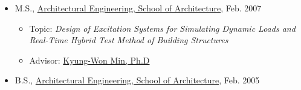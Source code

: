 \documentclass[10pt,a4paper,ragged2e]{altacv}
\begin{document}
\begin{fullwidth}
\begin{itemize}
\item M.S.,
        \href{http://cms.dankook.ac.kr/web/archi}
             {Architectural Engineering, School of Architecture},
             Feb. 2007
        \begin{itemize}
        \item Topic: \emph{Design of Excitation Systems for Simulating Dynamic Loads and Real-Time Hybrid Test Method of Building Structures}
        \item Advisor:
              \href{http://cms.dankook.ac.kr/web/archi/-16?p_p_id=DeptInfo_WAR_empInfoportlet&p_p_lifecycle=0&p_p_state=normal&p_p_mode=view&p_p_col_id=column-2&p_p_col_count=1&_DeptInfo_WAR_empInfoportlet_empId=2zEyEnhbhLlys2HRljBFWg%3D%3D&_DeptInfo_WAR_empInfoportlet_action=view_message}
                   {Kyung-Won Min, Ph.D}
        \end{itemize}
\item B.S.,
        \href{http://cms.dankook.ac.kr/web/archi}
             {Architectural Engineering, School of Architecture},
             Feb. 2005
\end{itemize}



\end{fullwidth}
\end{document}
